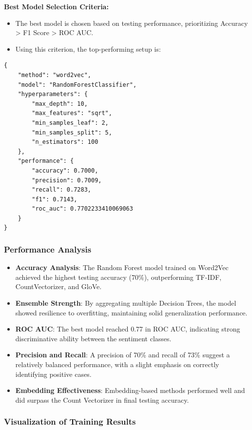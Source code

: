 \textbf{Best Model Selection Criteria:}

\begin{itemize}
    \item The best model is chosen based on testing performance, prioritizing Accuracy > F1 Score > ROC AUC.
    \item Using this criterion, the top-performing setup is:
\end{itemize}

\begin{verbatim}
{
    "method": "word2vec",
    "model": "RandomForestClassifier",
    "hyperparameters": {
        "max_depth": 10,
        "max_features": "sqrt",
        "min_samples_leaf": 2,
        "min_samples_split": 5,
        "n_estimators": 100
    },
    "performance": {
        "accuracy": 0.7000,
        "precision": 0.7009,
        "recall": 0.7283,
        "f1": 0.7143,
        "roc_auc": 0.7702233410069063
    }
}
\end{verbatim}

\subsubsection{Performance Analysis}

\begin{itemize}
    \item \textbf{Accuracy Analysis}: The Random Forest model trained on Word2Vec achieved the highest testing accuracy (70\%), outperforming TF-IDF, CountVectorizer, and GloVe.
    \item \textbf{Ensemble Strength}: By aggregating multiple Decision Trees, the model showed resilience to overfitting, maintaining solid generalization performance.
    \item \textbf{ROC AUC}: The best model reached 0.77 in ROC AUC, indicating strong discriminative ability between the sentiment classes.
    \item \textbf{Precision and Recall}: A precision of 70\% and recall of 73\% suggest a relatively balanced performance, with a slight emphasis on correctly identifying positive cases.
    \item \textbf{Embedding Effectiveness}: Embedding-based methods performed well and did surpass the Count Vectorizer in final testing accuracy.
\end{itemize}

\subsubsection{Visualization of Training Results}

